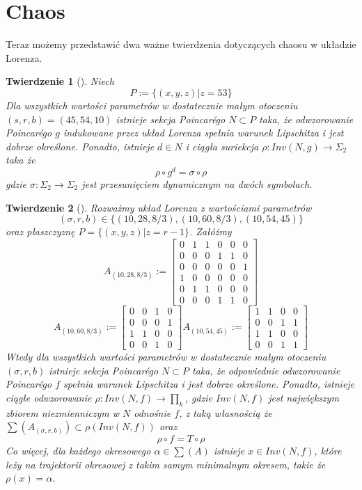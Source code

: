 \documentclass[12pt]{report}
\newtheorem{theorem}{Twierdzenie}
\begin{document}
	\section{Chaos}
	Teraz możemy przedstawić dwa ważne twierdzenia dotyczących chaosu w układzie Lorenza.
	\begin{theorem}[\hspace{1sp}\cite{MM}]
		Niech
			\[ P := \{(x, y, z) | z = 53\} \]
		Dla wszystkich wartości parametrów w dostatecznie małym otoczeniu $(s, r, b) = (45, 54, 10)$ istnieje sekcja Poincarégo $N \subset P$ taka, że odwzorowanie Poincarégo $g$ indukowane przez układ Lorenza spełnia warunek Lipschitza i jest dobrze określone. Ponadto, istnieje $d \in N$ i ciągła suriekcja $\rho: Inv(N, g) \to \Sigma_2$ taka że
			\[ \rho \circ g^d = \sigma \circ \rho \]
		gdzie $\sigma : \Sigma_2 \to \Sigma_2$ jest przesunięciem dynamicznym na dwóch symbolach.
	\end{theorem}
	\begin{theorem}[\hspace{1sp}\cite{MMS}]
		Rozważmy układ Lorenza z wartościami parametrów
			\[ (\sigma, r, b) \in \{(10, 28, 8/3), (10, 60, 8/3), (10, 54, 45)\} \]
		oraz płaszczyznę $P = \{(x, y, z) | z = r - 1\}$. Załóżmy
			\[ A_{(10,28,8/3)} := \begin{bmatrix}
									0 & 1 & 1 & 0 & 0 & 0 \\
									0 & 0 & 0 & 1 & 1 & 0 \\
									0 & 0 & 0 & 0 & 0 & 1 \\
									1 & 0 & 0 & 0 & 0 & 0 \\
									0 & 1 & 1 & 0 & 0 & 0 \\
									0 & 0 & 0 & 1 & 1 & 0
								\end{bmatrix}
			\]
			\[
			   A_{(10,60,8/3)} := \begin{bmatrix}
			   						0 & 0 & 1 & 0 \\
			   						0 & 0 & 0 & 1 \\
			   						1 & 1 & 0 & 0 \\
			   						0 & 0 & 1 & 0
			   					\end{bmatrix}
			   A_{(10,54,45)} := \begin{bmatrix}
			   						1 & 1 & 0 & 0 \\
			   						0 & 0 & 1 & 1 \\
			   						1 & 1 & 0 & 0 \\
			   						0 & 0 & 1 & 1
			   					\end{bmatrix}
			\]
		Wtedy dla wszystkich wartości parametrów w dostatecznie małym otoczeniu $(\sigma, r, b)$ istnieje sekcja Poincarégo $N \subset P$ taka, że odpowiednie odwzorowanie Poincarégo $f$ spełnia warunek Lipschitza i jest dobrze określone. Ponadto, istnieje ciągłe odwzorowanie $\rho : Inv(N, f) \to \prod_k$, gdzie $Inv(N, f)$ jest największym zbiorem niezmienniczym w $N$ odnośnie $f$, z taką własnością że $\sum (A_{(\sigma, r, b)}) \subset \rho (Inv(N, f))$ oraz
			\[ \rho \circ f = T \circ \rho \]
		Co więcej, dla każdego okresowego $\alpha \in \sum (A)$ istnieje $x \in Inv(N, f)$, które leży na trajektorii okresowej z takim samym minimalnym okresem, takie że $\rho(x) = \alpha$.
	\end{theorem}
\end{document}
